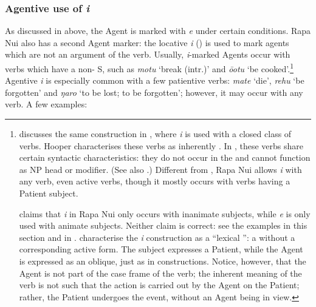 \subsubsection[Agentive use of i]{Agentive use of \textit{i}}\label{sec:8.6.4.7}
As discussed in  above, the Agent is marked with \textit{e} under certain conditions. Rapa Nui also has a second Agent marker: the locative  \textit{i} () is used to mark agents which are not an argument of the verb. Usually, \textit{i}{}-marked Agents occur with  verbs which have a non- S, such as \textit{motu} ‘break (intr.)’ and \textit{{\ꞌ}ō{\ꞌ}otu} ‘be cooked’.\footnote{\label{fn:445}\citet{Hooper1984Neuter} discusses the same construction in , where  \textit{i} is used with a closed class of verbs. Hooper characterises these verbs as inherently . In , these verbs share certain syntactic characteristics: they do not occur in the  and cannot function as NP head or modifier. (See also \citealt[33]{Pucilowsky2006}.) Different from , Rapa Nui allows  \textit{i} with any  verb, even active verbs, though it mostly occurs with verbs having a Patient subject. 

\citet[135]{Alexander1981OL} claims that  \textit{i} in Rapa Nui only occurs with inanimate subjects, while \textit{e} is only used with animate subjects. Neither claim is correct: see the examples in this section and in . \citet[21]{FinneyAlexander1998} characterise the  \textit{i} construction as a “lexical ”: a  without a corresponding active form. The subject expresses a Patient, while the Agent is expressed as an oblique, just as in  constructions. Notice, however, that the Agent is not part of the case frame of the verb; the inherent meaning of the verb is not such that the action is carried out by the Agent on the Patient; rather, the Patient undergoes the event, without an Agent being in view.}  Agentive \textit{i} is especially common with a few patientive verbs: \textit{mate} ‘die’, \textit{rehu} ‘be forgotten’ and \textit{ŋaro} ‘to be lost; to be forgotten’; however, it may occur with any  verb. A few examples:

